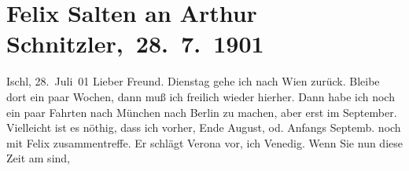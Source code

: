 

         
         \renewcommand{\erwaehntePersonen}{Personen: Friedrich von Bodenstedt, Hugo Felix, Felix Salten, Mirzä Şäfi Vazeh, Josef Willomitzer, Bogumil Zepler}
         \renewcommand{\erwaehnteOrte}{Orte: Bad Ischl, Berlin, Jung-Wiener Theater zum Lieben Augustin, Lago di Garda, München, Vahrn, Venedig, Verona, Wien}
         \renewcommand{\erwaehnteWerke}{Werke: Der einsame Weg. Schauspiel in fünf Akten, Die Gedenktafel der Prinzessin Anna, Die Insel. Monatsschrift mit Buchschmuck und Illustrationen, Hafisa, Neue Loreley}
               \section[ Felix Salten an Arthur Schnitzler, 28. 7. 1901]{ Felix Salten an Arthur Schnitzler, 28. 7. 1901}\nopagebreak{}\rehead{ }\begin{ledgroupsized}[t]{13cm}\normalsize\beginnumbering{} \toendnotes[C]{\smallbreak\pagebreak[2]} 
\toendnotes[C]{\smallbreak}\pstart
           \raggedleft{}{\pb}Ischl, 28. Juli 01\pend
           \pstart
           Lieber Freund.{ }Dienstag gehe ich nach Wien zurück. Bleibe dort ein paar Wochen, dann muß ich freilich wieder
               hierher. Dann habe ich noch ein paar Fahrten nach München nach Berlin zu
               machen, aber erst im September. Vielleicht ist es nöthig,
               dass ich vorher, Ende August, od. Anfangs Septemb. noch mit Felix zusammentreffe. Er schlägt Verona vor, ich Venedig.
               Wenn Sie nun diese Zeit am \label{K_L03316-1v}\label{K_L03316-1h} sind,

\end{ledgroupsized}
